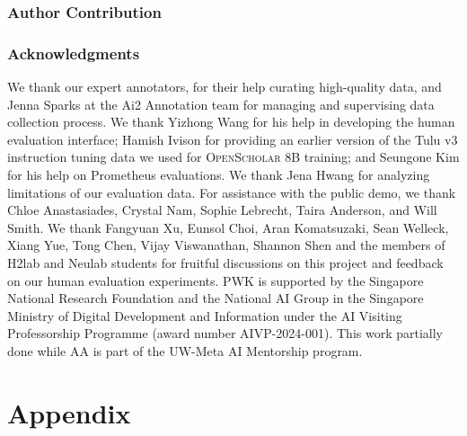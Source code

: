 \documentclass{article} %
\newcommand{\model}{\textsc{OpenScholar}\xspace}
\begin{document}
\newpage
\subsubsection*{Author Contribution}


\subsubsection*{Acknowledgments}
We thank our expert annotators, for their help curating high-quality data, and Jenna Sparks at the Ai2 Annotation team for managing and supervising data collection process. 
 We thank Yizhong Wang for his help in developing the human evaluation interface; Hamish Ivison for providing an earlier version of the Tulu v3 instruction tuning data we used for \model 8B training; and Seungone Kim for his help on Prometheus evaluations. We thank Jena Hwang for analyzing limitations of our evaluation data.
 For assistance with the public demo, we thank Chloe Anastasiades, Crystal Nam, Sophie Lebrecht, Taira Anderson, and Will Smith. 
We thank Fangyuan Xu, Eunsol Choi, Aran Komatsuzaki, Sean Welleck, Xiang Yue, Tong Chen, Vijay Viswanathan, Shannon Shen and the members of H2lab and Neulab students for fruitful discussions on this project and feedback on our human evaluation experiments. 
PWK is supported by the Singapore National Research Foundation and the National AI Group in the Singapore Ministry of Digital Development and Information under the AI Visiting Professorship Programme (award number AIVP-2024-001). 
This work partially done while AA is part of the UW-Meta AI Mentorship program. 





\newpage
\appendix
\section*{Appendix}

\end{document}
